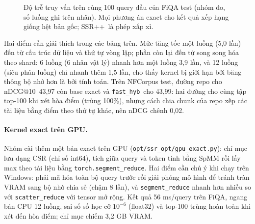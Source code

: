 \documentclass[a4paper,13pt]{extreport}
\makeatletter
\theoremstyle{plain}
\newcommand{\ssrpp}{SSR++}
\newcommand{\ndcg}{nDCG@10}
\newcommand{\fasthyb}{\texttt{fast\_hyb}}
\makeatother
\begin{document}
\begin{figure}[htbp]
\centering
{}
\caption[Độ trễ truy vấn trên cùng 100 query FiQA (nhóm đo)]{Độ trễ truy vấn trên cùng 100 query đầu của FiQA test (nhóm đo, số luồng ghi trên nhãn). Mọi phương án exact cho kết quả xếp hạng giống hệt bản gốc; \ssrpp\ là phép xấp xỉ.}
\label{fig:latency}
\end{figure}

Hai điểm cần giải thích trong các bảng trên. Mức tăng tốc một luồng (5,0 lần) đến từ cấu trúc dữ liệu và thứ tự vòng lặp; phần còn lại đến từ song song hóa theo shard: 6 luồng (6 nhân vật lý) nhanh hơn một luồng 3,9 lần, và 12 luồng (siêu phân luồng) chỉ nhanh thêm 1,5 lần, cho thấy kernel bị giới hạn bởi băng thông bộ nhớ hơn là bởi tính toán. Trên NFCorpus test, đường repo cho \ndcg\ 43,97 còn base exact và \fasthyb\ cho 43,99: hai đường cho cùng tập top-100 khi xét hòa điểm (trùng 100\%), nhưng cách chia chunk của repo xếp các tài liệu bằng điểm theo thứ tự khác, nên nDCG chênh 0,02.

\paragraph{Kernel exact trên GPU.} Nhóm cài thêm một bản exact trên GPU (\texttt{opt/ssr\_opt/gpu\_exact.py}): chỉ mục lưu dạng CSR (chỉ số int64), tích giữa query và token tính bằng SpMM rồi lấy max theo tài liệu bằng \texttt{torch.segment\_reduce}. Hai điểm cần chú ý khi chạy trên Windows: phải mã hóa toàn bộ query trước rồi giải phóng mô hình để tránh tràn VRAM sang bộ nhớ chia sẻ (chậm 8 lần), và \texttt{segment\_reduce} nhanh hơn nhiều so với \texttt{scatter\_reduce} với tensor mở rộng. Kết quả 56 ms/query trên FiQA, ngang bản CPU 12 luồng, sai số số học cỡ $10^{-6}$ (float32) và top-100 trùng hoàn toàn khi xét đến hòa điểm; chỉ mục chiếm 3,2 GB VRAM.
\end{document}
